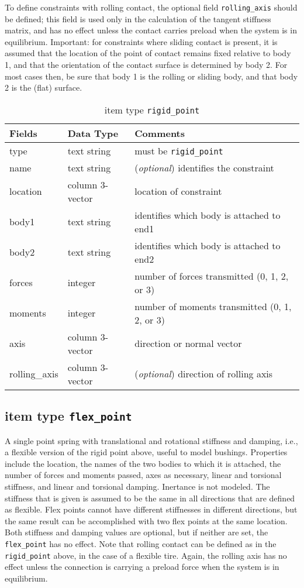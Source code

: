 To define constraints with rolling contact, the optional field \texttt{rolling\_axis} should be defined; this field is used only in the calculation of the tangent stiffness matrix, and has no effect unless the contact carries preload when the system is in equilibrium.  Important: for constraints where sliding contact is present, it is assumed that the location of the point of contact remains fixed relative to body 1, and that the orientation of the contact surface is determined by body 2.  For most cases then, be sure that body 1 is the rolling or sliding body, and that body 2 is the (flat) surface.

\begin{table}[!h]
\caption{item type \texttt{rigid\_point}}
\label{rigidpoint}
\begin{center}
\begin{tabular}{lll}
\toprule
Fields & Data Type & Comments\\
\midrule
type & text string & must be \texttt{rigid\_point}\\
name & text string & (\emph{optional}) identifies the constraint\\
location & column 3-vector & location of constraint\\
body1 & text string & identifies which body is attached to end1\\
body2 & text string & identifies which body is attached to end2\\
forces & integer & number of forces transmitted (0, 1, 2, or 3)\\
moments & integer & number of moments transmitted (0, 1, 2, or 3)\\
axis & column 3-vector & direction or normal vector\\
rolling\_axis & column 3-vector & (\emph{optional}) direction of rolling axis\\
\bottomrule
\end{tabular}
\end{center}
\end{table}
\clearpage

\subsection{item type \texttt{flex\_point}}
A single point spring with translational and rotational stiffness and damping, i.e., a flexible version of the rigid point above, useful to model bushings.  Properties include the location, the names of the two bodies to which it is attached, the number of forces and moments passed, axes as necessary, linear and torsional stiffness, and linear and torsional damping.  Inertance is not modeled.  The stiffness that is given is assumed to be the same in all directions that are defined as flexible.  Flex points cannot have different stiffnesses in different directions, but the same result can be accomplished with two flex points at the same location.  Both stiffness and damping values are optional, but if neither are set, the \texttt{flex\_point} has no effect.  Note that rolling contact can be defined as in the \texttt{rigid\_point} above, in the case of a flexible tire.  Again, the rolling axis has no effect unless the connection is carrying a preload force when the system is in equilibrium.

